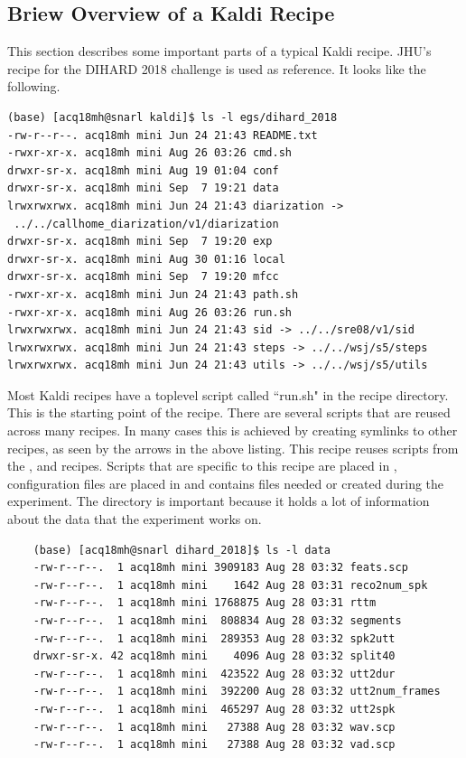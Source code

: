 	\subsection{Briew Overview of a Kaldi Recipe}
	This section describes some important parts of a typical Kaldi recipe. JHU's recipe for the DIHARD 2018 challenge  is used as reference. It looks like the following.
	
	\begin{verbatim}
(base) [acq18mh@snarl kaldi]$ ls -l egs/dihard_2018
-rw-r--r--. acq18mh mini Jun 24 21:43 README.txt
-rwxr-xr-x. acq18mh mini Aug 26 03:26 cmd.sh
drwxr-sr-x. acq18mh mini Aug 19 01:04 conf
drwxr-sr-x. acq18mh mini Sep  7 19:21 data
lrwxrwxrwx. acq18mh mini Jun 24 21:43 diarization ->
 ../../callhome_diarization/v1/diarization
drwxr-sr-x. acq18mh mini Sep  7 19:20 exp
drwxr-sr-x. acq18mh mini Aug 30 01:16 local
drwxr-sr-x. acq18mh mini Sep  7 19:20 mfcc
-rwxr-xr-x. acq18mh mini Jun 24 21:43 path.sh
-rwxr-xr-x. acq18mh mini Aug 26 03:26 run.sh
lrwxrwxrwx. acq18mh mini Jun 24 21:43 sid -> ../../sre08/v1/sid
lrwxrwxrwx. acq18mh mini Jun 24 21:43 steps -> ../../wsj/s5/steps
lrwxrwxrwx. acq18mh mini Jun 24 21:43 utils -> ../../wsj/s5/utils
	\end{verbatim}
	
	Most Kaldi recipes have a toplevel script called ``run.sh" in the recipe directory. This is the starting point of the recipe. There are several scripts that are reused across many recipes. In many cases this is achieved by creating symlinks to other recipes, as seen by the arrows in the above listing. This recipe reuses scripts from the ,  and  recipes. Scripts that are specific to this recipe are placed in , configuration files are placed in  and  contains files needed or created during the experiment. The  directory is important because it holds a lot of information about the data that the experiment works on.
	
	\begin{verbatim}
	(base) [acq18mh@snarl dihard_2018]$ ls -l data
	-rw-r--r--.  1 acq18mh mini 3909183 Aug 28 03:32 feats.scp
	-rw-r--r--.  1 acq18mh mini    1642 Aug 28 03:31 reco2num_spk
	-rw-r--r--.  1 acq18mh mini 1768875 Aug 28 03:31 rttm
	-rw-r--r--.  1 acq18mh mini  808834 Aug 28 03:32 segments
	-rw-r--r--.  1 acq18mh mini  289353 Aug 28 03:32 spk2utt
	drwxr-sr-x. 42 acq18mh mini    4096 Aug 28 03:32 split40
	-rw-r--r--.  1 acq18mh mini  423522 Aug 28 03:32 utt2dur
	-rw-r--r--.  1 acq18mh mini  392200 Aug 28 03:32 utt2num_frames
	-rw-r--r--.  1 acq18mh mini  465297 Aug 28 03:32 utt2spk
	-rw-r--r--.  1 acq18mh mini   27388 Aug 28 03:32 wav.scp
	-rw-r--r--.  1 acq18mh mini   27388 Aug 28 03:32 vad.scp
	\end{verbatim}
	
